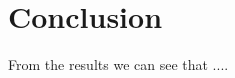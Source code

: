 \documentclass[letterpaper, 9 pt, balance, conference]{ieeeconf}
\begin{document}






\section{Conclusion}
\label{sec:concl}

From the results we can see that ....

\balance

\end{document}
